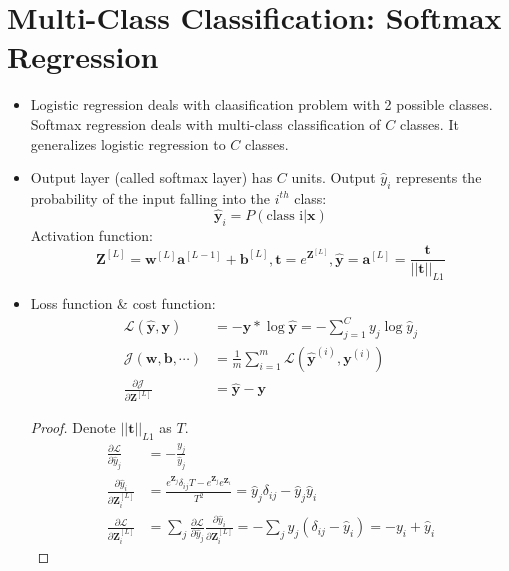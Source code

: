 \section{Multi-Class Classification: Softmax Regression}
\begin{itemize}
  \item Logistic regression deals with claasification problem with 2 possible classes. Softmax regression deals with multi-class classification of $C$ classes. It generalizes logistic regression to $C$ classes.
  \item Output layer (called softmax layer) has $C$ units. Output $\hat{y}_i$ represents the probability of the input falling into the $i^{th}$ class:
  \[\hat{\mathbf{y}}_i=P\left(\text{class i}\vert \mathbf{x}\right)\] Activation function:
    \[\mathbf{Z}^{[L]}=\mathbf{w}^{[L]}\mathbf{a}^{[L-1]}+\mathbf{b}^{[L]},\mathbf{t}=e^{\mathbf{Z}^{[L]}},\hat{\mathbf{y}}=\mathbf{a}^{[L]}=\frac{\mathbf{t}}{\vert\vert\mathbf{t}\vert\vert_{L1}}\]
  \item Loss function \& cost function:
  \begin{align*}
    \mathcal{L}\left(\hat{\mathbf{y}},\mathbf{y}\right)&=-\mathbf{y}*\log{\hat{\mathbf{y}}}=-\displaystyle\sum_{j=1}^{C}y_j\log{\hat{y}_j}\\
    \mathcal{J}\left(\mathbf{w}, \mathbf{b}, \cdots\right)&=\frac{1}{m}\displaystyle\sum_{i=1}^m\mathcal{L}\left(\hat{\mathbf{y}}^{(i)},\mathbf{y}^{(i)}\right)\\
    \frac{\partial \mathcal{J}}{\partial \mathbf{Z}^{[L]}}&=\hat{\mathbf{y}}-\mathbf{y}
  \end{align*}
  \begin{proof}
    Denote $\vert\vert\mathbf{t}\vert\vert_{L1}$ as $T$.
    \begin{align*}
    \frac{\partial \mathcal{L}}{\partial \hat{y}_j}&=-\frac{y_j}{\hat{y}_j}\\
    \frac{\partial \hat{y}_i}{\partial \mathbf{Z}^{[L]}_i}&=\frac{e^{\mathbf{Z}_j}\delta_{ij}T-e^{\mathbf{Z}_j}e^{\mathbf{Z}_i}}{T^2}=\hat{y}_j\delta_{ij}-\hat{y}_j\hat{y}_i\\
    \frac{\partial \mathcal{L}}{\partial \mathbf{Z}^{[L]}_i}&=\displaystyle\sum_{j}\frac{\partial \mathcal{L}}{\partial \hat{y}_j}\frac{\partial \hat{y}_i}{\partial \mathbf{Z}^{[L]}_i}=-\displaystyle\sum_{j}y_j(\delta_{ij}-\hat{y}_i)=-y_i+\hat{y}_i
    \end{align*}
  \end{proof}
\end{itemize}
\ifx\PREAMBLE\undefined

\fi